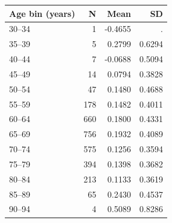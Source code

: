 \begin{tabular*}{\linewidth}{@{\extracolsep{\fill}}lrrr}\toprule
Age bin (years) & N & Mean & SD \\
\midrule
30--34 &         1 &   -0.4655 &         . \\
35--39 &         5 &    0.2799 &    0.6294 \\
40--44 &         7 &   -0.0688 &    0.5094 \\
45--49 &        14 &    0.0794 &    0.3828 \\
50--54 &        47 &    0.1480 &    0.4688 \\
55--59 &       178 &    0.1482 &    0.4011 \\
60--64 &       660 &    0.1800 &    0.4331 \\
65--69 &       756 &    0.1932 &    0.4089 \\
70--74 &       575 &    0.1256 &    0.3594 \\
75--79 &       394 &    0.1398 &    0.3682 \\
80--84 &       213 &    0.1133 &    0.3619 \\
85--89 &        65 &    0.2430 &    0.4537 \\
90--94 &         4 &    0.5089 &    0.8286 \\
\bottomrule\end{tabular*}
